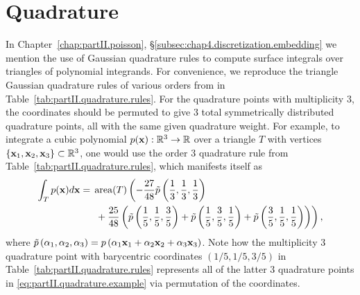 %

\chapter{Quadrature} \label{chap:partII.appendix.quadrature}

In Chapter~\ref{chap:partII.poisson}, \S\ref{subsec:chap4.discretization.embedding} we mention the use of Gaussian quadrature rules to compute surface integrals over triangles of polynomial integrands. For convenience, we reproduce the triangle Gaussian quadrature rules of various orders from \cite{Cowper73} in Table~\ref{tab:partII.quadrature.rules}. For the quadrature points with multiplicity $3$, the coordinates should be permuted to give $3$ total symmetrically distributed quadrature points, all with the same given quadrature weight. For example, to integrate a cubic polynomial $p(\mathbf{x}) : \mathbb{R}^3 \to \mathbb{R}$ over a triangle $T$ with vertices $\{\mathbf{x}_1, \mathbf{x}_2, \mathbf{x}_3\} \subset \mathbb{R}^3$, one would use the order $3$ quadrature rule from Table~\ref{tab:partII.quadrature.rules}, which manifests itself as
\begin{equation} \label{eq:partII.quadrature.example}
\begin{split}
\int_T p(\mathbf{x}) d\mathbf{x} = {} & \operatorname{area}(T) \left( -\frac{27}{48} \tilde{p} \left( \frac{1}{3}, \frac{1}{3}, \frac{1}{3} \right) \right. \\ & \left. {} + \frac{25}{48} \left( \tilde{p} \left( \frac{1}{5}, \frac{1}{5}, \frac{3}{5} \right) + \tilde{p} \left( \frac{1}{5}, \frac{3}{5}, \frac{1}{5} \right) + \tilde{p} \left( \frac{3}{5}, \frac{1}{5}, \frac{1}{5} \right) \right) \right),
\end{split}
\end{equation}
where $\tilde{p} \left( \alpha_1, \alpha_2, \alpha_3 \right) = p \left( \alpha_1 \mathbf{x}_1 + \alpha_2 \mathbf{x}_2 + \alpha_3 \mathbf{x}_3 \right)$. Note how the multiplicity $3$ quadrature point with barycentric coordinates $(1/5, 1/5, 3/5)$ in Table~\ref{tab:partII.quadrature.rules} represents all of the latter $3$ quadrature points in \eqref{eq:partII.quadrature.example} via permutation of the coordinates.

